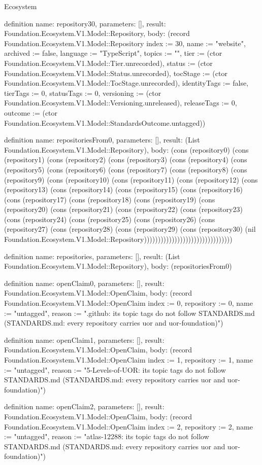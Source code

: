 \begin{lexlean}{Ecosystem}
\begin{semanticmodule}
definition{
  name: repository30,
  parameters: [],
  result: Foundation.Ecosystem.V1.Model::Repository,
  body: (record Foundation.Ecosystem.V1.Model::Repository {index := 30, name := "website", archived := false, language := "TypeScript", topics := "", tier := (ctor Foundation.Ecosystem.V1.Model::Tier.unrecorded), status := (ctor Foundation.Ecosystem.V1.Model::Status.unrecorded), tocStage := (ctor Foundation.Ecosystem.V1.Model::TocStage.unrecorded), identityTags := false, tierTags := 0, statusTags := 0, versioning := (ctor Foundation.Ecosystem.V1.Model::Versioning.unreleased), releaseTags := 0, outcome := (ctor Foundation.Ecosystem.V1.Model::StandardsOutcome.untagged)})
}

definition{
  name: repositoriesFrom0,
  parameters: [],
  result: (List Foundation.Ecosystem.V1.Model::Repository),
  body: (cons (repository0) (cons (repository1) (cons (repository2) (cons (repository3) (cons (repository4) (cons (repository5) (cons (repository6) (cons (repository7) (cons (repository8) (cons (repository9) (cons (repository10) (cons (repository11) (cons (repository12) (cons (repository13) (cons (repository14) (cons (repository15) (cons (repository16) (cons (repository17) (cons (repository18) (cons (repository19) (cons (repository20) (cons (repository21) (cons (repository22) (cons (repository23) (cons (repository24) (cons (repository25) (cons (repository26) (cons (repository27) (cons (repository28) (cons (repository29) (cons (repository30) (nil Foundation.Ecosystem.V1.Model::Repository))))))))))))))))))))))))))))))))
}

definition{
  name: repositories,
  parameters: [],
  result: (List Foundation.Ecosystem.V1.Model::Repository),
  body: (repositoriesFrom0)
}

definition{
  name: openClaim0,
  parameters: [],
  result: Foundation.Ecosystem.V1.Model::OpenClaim,
  body: (record Foundation.Ecosystem.V1.Model::OpenClaim {index := 0, repository := 0, name := "untagged", reason := ".github: its topic tags do not follow STANDARDS.md (STANDARDS.md: every repository carries uor and uor-foundation)"})
}

definition{
  name: openClaim1,
  parameters: [],
  result: Foundation.Ecosystem.V1.Model::OpenClaim,
  body: (record Foundation.Ecosystem.V1.Model::OpenClaim {index := 1, repository := 1, name := "untagged", reason := "5-Levels-of-UOR: its topic tags do not follow STANDARDS.md (STANDARDS.md: every repository carries uor and uor-foundation)"})
}

definition{
  name: openClaim2,
  parameters: [],
  result: Foundation.Ecosystem.V1.Model::OpenClaim,
  body: (record Foundation.Ecosystem.V1.Model::OpenClaim {index := 2, repository := 2, name := "untagged", reason := "atlas-12288: its topic tags do not follow STANDARDS.md (STANDARDS.md: every repository carries uor and uor-foundation)"})
}


\end{semanticmodule}
\end{lexlean}
